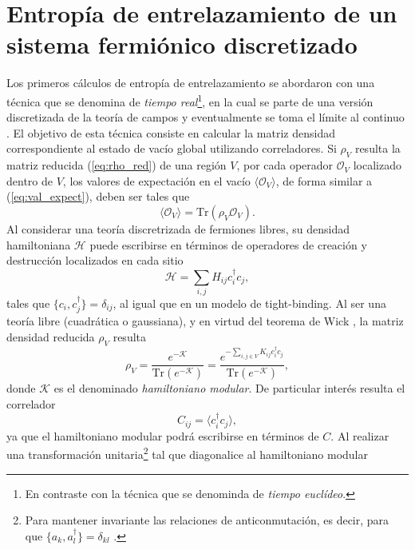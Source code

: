 \section{Entropía de entrelazamiento de un sistema fermiónico discretizado \label{sec:EE_lattice_f}} 
Los primeros cálculos de entropía de entrelazamiento se abordaron con una técnica que se denomina de \textit{tiempo real}\footnote{En contraste con la técnica que se denominda de \textit{tiempo euclídeo}.}, en la cual se parte de una versión discretizada de la teoría de campos y eventualmente se toma el límite al continuo \cite{Casini:2009sr}. El objetivo de esta técnica consiste en calcular la matriz densidad correspondiente al estado de vacío global utilizando correladores. Si $\rho_V$ resulta la matriz reducida (\ref{eq:rho_red}) de una región $V$, por cada operador $\mathcal{O}_V$ localizado dentro de $V$, los valores de expectación en el vacío $\langle \mathcal{O}_V \rangle$, de forma similar a  (\ref{eq:val_expect}), deben ser tales que \cite{Casini:2009sr}\cite{Casini:2005rm}
\begin{equation}
\langle \mathcal{O}_V \rangle = \text{Tr}(\rho_V\mathcal{O}_V).
\end{equation}
Al considerar una teoría discretrizada de fermiones libres, su densidad hamiltoniana $\mathcal{H}$ puede escribirse en términos de operadores de creación y destrucción localizados en cada sitio
\begin{equation}
\mathcal{H}=\sum_{i,j}H_{ij}c_i^{\dag}c_j,
\label{ec:ham_dic}
\end{equation}
tales que $\lbrace c_i,c_j^{\dag}\rbrace=\delta_{ij}$, al igual que en un modelo de tight-binding. Al ser una teoría libre (cuadrática o gaussiana), y en virtud del teorema de Wick \cite{peschel2002}, la matriz densidad reducida $\rho_V$ resulta
\begin{equation}
\rho_V=\frac{e^{-\mathcal{K}}}{\text{Tr}(e^{-\mathcal{K}})}=\frac{e^{-\sum_{i,j\in V}K_{ij}c_i^{\dag}c_j}}{\text{Tr}(e^{-\mathcal{K}})},
\end{equation}
donde $\mathcal{K}$ es el denominado \textit{hamiltoniano modular}. De particular interés resulta el correlador
\begin{equation}
C_{ij}=\langle c_i^{\dag}c_j \rangle ,
\end{equation}
ya que el hamiltoniano modular podrá escribirse en términos de $C$. Al realizar una transformación unitaria\footnote{Para mantener invariante las relaciones de anticonmutación, es decir, para que $\lbrace a_k,a_l^{\dag}\rbrace =\delta_{kl}$ .} tal que diagonalice al hamiltoniano modular
